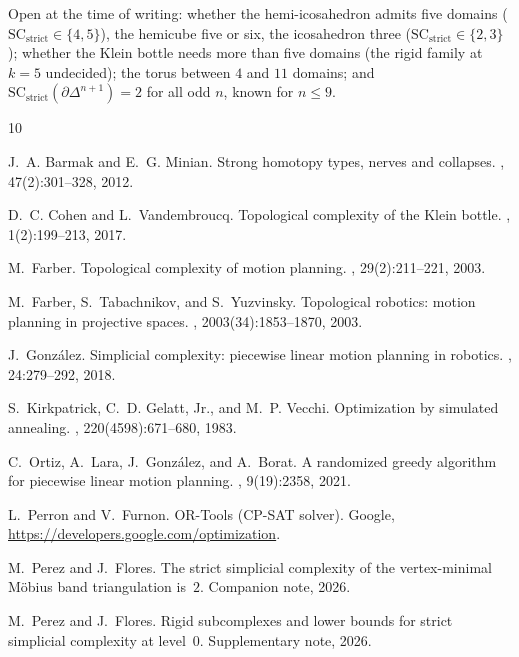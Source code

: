 \documentclass[12pt]{article}
\newcommand{\SC}{\mathrm{SC}}
\newcommand{\SCst}{\SC_{\mathrm{strict}}}
\begin{document}
Open at the time of writing: whether the hemi-icosahedron admits five
domains ($\SCst\in\{4,5\}$), the hemicube five or six, the icosahedron three
($\SCst\in\{2,3\}$); whether the Klein bottle needs more than five domains
(the rigid family at $k=5$ undecided); the torus between $4$ and $11$
domains; and $\SCst(\partial\Delta^{n+1})=2$ for all odd $n$, known for
$n\le9$.

\begin{thebibliography}{10}

J.~A. Barmak and E.~G. Minian.
\newblock Strong homotopy types, nerves and collapses.
, 47(2):301--328, 2012.

D.~C. Cohen and L.~Vandembroucq.
\newblock Topological complexity of the Klein bottle.
, 1(2):199--213, 2017.

M.~Farber.
\newblock Topological complexity of motion planning.
, 29(2):211--221, 2003.

M.~Farber, S.~Tabachnikov, and S.~Yuzvinsky.
\newblock Topological robotics: motion planning in projective spaces.
, 2003(34):1853--1870, 2003.

J.~Gonz\'alez.
\newblock Simplicial complexity: piecewise linear motion planning in
  robotics.
, 24:279--292, 2018.

S.~Kirkpatrick, C.~D. Gelatt, Jr., and M.~P. Vecchi.
\newblock Optimization by simulated annealing.
, 220(4598):671--680, 1983.

C.~Ortiz, A.~Lara, J.~Gonz\'alez, and A.~Borat.
\newblock A randomized greedy algorithm for piecewise linear motion
  planning.
, 9(19):2358, 2021.

L.~Perron and V.~Furnon.
\newblock OR-Tools (CP-SAT solver).
\newblock Google, \url{https://developers.google.com/optimization}.

M.~Perez and J.~Flores.
\newblock The strict simplicial complexity of the vertex-minimal
  M\"obius band triangulation is~$2$.
\newblock Companion note, 2026.

M.~Perez and J.~Flores.
\newblock Rigid subcomplexes and lower bounds for strict simplicial
  complexity at level~$0$.
\newblock Supplementary note, 2026.

\end{thebibliography}
\end{document}
